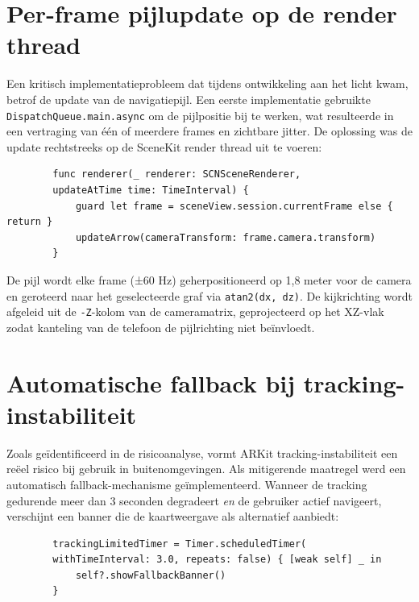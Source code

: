 \section{Per-frame pijlupdate op de render thread}

Een kritisch implementatieprobleem dat tijdens ontwikkeling aan het licht kwam, betrof de update van de navigatiepijl. Een eerste implementatie gebruikte \texttt{DispatchQueue.main.async} om de pijlpositie bij te werken, wat resulteerde in een vertraging van één of meerdere frames en zichtbare jitter. De oplossing was de update rechtstreeks op de SceneKit render thread uit te voeren:

\begin{listing}[H]
    \begin{verbatim}
        func renderer(_ renderer: SCNSceneRenderer,
        updateAtTime time: TimeInterval) {
            guard let frame = sceneView.session.currentFrame else { return }
            updateArrow(cameraTransform: frame.camera.transform)
        }
    \end{verbatim}
    \caption[Per-frame pijlupdate]{Per-frame update van de navigatiepijl op de SceneKit render thread.}
\end{listing}

De pijl wordt elke frame (±60 Hz) geherpositioneerd op 1,8 meter voor de camera en geroteerd naar het geselecteerde graf via \texttt{atan2(dx, dz)}. De kijkrichting wordt afgeleid uit de \texttt{-Z}-kolom van de cameramatrix, geprojecteerd op het XZ-vlak zodat kanteling van de telefoon de pijlrichting niet beïnvloedt.

\section{Automatische fallback bij tracking-instabiliteit}
\label{sec:fallback}

Zoals geïdentificeerd in de risicoanalyse, vormt ARKit tracking-instabiliteit een reëel risico bij gebruik in buitenomgevingen. Als mitigerende maatregel werd een automatisch fallback-mechanisme geïmplementeerd. Wanneer de tracking gedurende meer dan 3 seconden degradeert \textit{en} de gebruiker actief navigeert, verschijnt een banner die de kaartweergave als alternatief aanbiedt:

\begin{listing}[H]
    \begin{verbatim}
        trackingLimitedTimer = Timer.scheduledTimer(
        withTimeInterval: 3.0, repeats: false) { [weak self] _ in
            self?.showFallbackBanner()
        }
    \end{verbatim}
    \caption[Fallback timer]{Timer-gebaseerde activatie van de fallback-banner bij tracking-instabiliteit.}
\end{listing}

